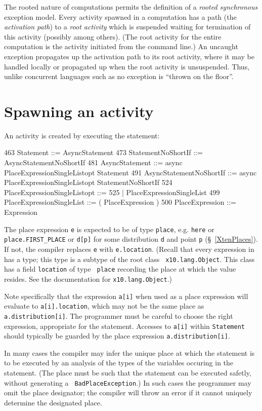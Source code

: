 The rooted nature of \Xten{} computations permits the definition of a
{\em rooted synchronous} exception model.  Every activity spawned in a
computation has a path (the {\em activation path}) to a {\em root
activity} which is suspended waiting for termination of this activity
(possibly among others). (The root activity for the entire computation
is the activity initiated from the command line.) An uncaught
exception propagates up the activation path to its root activity,
where it may be handled locally or propagated up when the root
activity is unsuspended. Thus, unlike concurrent languages such as \java{} no
exception is ``thrown on the floor''.

\section{Spawning an activity}\label{AsynchronousActivity}\label{AsyncActivity}
An activity is created by executing the statement:
\begin{x10}
463 Statement ::= AsyncStatement
473 StatementNoShortIf ::= AsyncStatementNoShortIf
481 AsyncStatement ::= 
      async PlaceExpressionSingleListopt Statement
491 AsyncStatementNoShortIf ::= 
      async PlaceExpressionSingleListopt 
         StatementNoShortIf
524   PlaceExpressionSingleListopt ::=
525       | PlaceExpressionSingleList
499   PlaceExpressionSingleList ::= 
         ( PlaceExpression )
500   PlaceExpression ::= Expression
\end{x10} 

The place expression {\tt e} is expected to be of type {\tt place},
e.g.{} {\tt here} or {\tt place.FIRST\_PLACE} or {\tt d[p]} for some
distribution {\tt d} and point {\tt p} (\S~\ref{XtenPlaces}).  
If not, the compiler replaces
{\tt e} with {\tt e.location}. (Recall that every expression in
\Xten{} has a type; this type is a subtype of the root class {\tt
x10.lang.Object}.  This class has a field {\tt location} of type {\tt
place} recording the place at which the value resides. See
the documentation for {\tt x10.lang.Object}.)

Note specifically that the expression {\tt a[i]} when used as a place
expression will evaluate to {\tt a[i].location}, which may not be
the same place as {\tt a.distribution[i]}. The programmer must be 
careful to choose the right expression, appropriate for the statement.
Accesses to {\tt a[i]} within {\tt Statement} should typically be guarded 
by the place expression {\tt a.distribution[i]}.

In many cases the compiler may infer the unique place at which the
statement is to be executed by an analysis of the types of the
variables occuring in the statement. (The place must be such that the
statement can be executed safetly, without generating a {\tt
BadPlaceException}.) In such cases the programmer may omit the place
designator; the compiler will throw an error if it cannot uniquely
determine the designated place.

